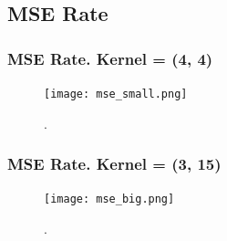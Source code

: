 \documentclass[hyperref={pdfpagelabels=false}]{beamer}
\begin{document}
\subsection{MSE Rate}
\begin{frame}
\frametitle{MSE Rate. Kernel = (4, 4)}

\begin{center}
\begin{figure}[h]
\begin{adjustwidth}{-0.3cm}{0.9 cm}
\texttt{[image: mse\_small.png]}
\end{adjustwidth}
\caption{.}
\end{figure}
\end{center}

\end{frame}
\begin{frame}
\frametitle{MSE Rate. Kernel = (3, 15)}

\begin{center}
\begin{figure}[h]
\begin{adjustwidth}{-0.3cm}{0.9 cm}
\texttt{[image: mse\_big.png]}
\end{adjustwidth}
\caption{.}
\end{figure}
\end{center}

\end{frame}
\end{document}
